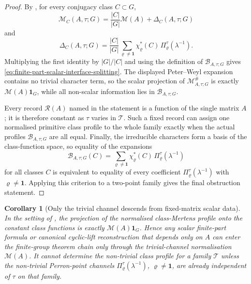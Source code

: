 \documentclass[11pt,a4paper]{amsart}
\theoremstyle{plain}
\newtheorem{corollary}[theorem]{Corollary}
\theoremstyle{definition}
\theoremstyle{remark}
\begin{document}
\begin{proof}
  By , for every conjugacy class
  \(C\subset G\),
  \[
    \mathcal M_C(A,\tau;G)
    =
    \frac{|C|}{|G|}\mathcal M(A)+\Delta_C(A,\tau;G)
  \]
  and
  \[
    \Delta_C(A,\tau;G)
    =
    \frac{|C|}{|G|}
      \sum_{\varrho\neq\mathbf1}
        \chi_\varrho^\ast(C)\,\Pi_\varrho^\tau(\lambda^{-1}).
  \]
  Multiplying the first identity by \(|G|/|C|\) and using the definition
  of \(\mathcal B_{A,\tau;G}\) gives
  \eqref{eq:finite-part-scalar-interface-splitting}. The displayed
  Peter--Weyl expansion contains no trivial character term, so the scalar
  projection of \(\mathcal M^\#_{A,\tau;G}\) is exactly
  \(\mathcal M(A)\mathbf1_G\), while all non-scalar information lies in
  \(\mathcal B_{A,\tau;G}\).

  Every record \(\mathcal R(A)\) named in the statement is a function of
  the single matrix \(A\); it is therefore constant as \(\tau\) varies in
  \(\mathscr T\). Such a fixed record can assign one normalised primitive
  class profile to the whole family exactly when the actual profiles
  \(\mathcal B_{A,\tau;G}\) are all equal. Finally, the irreducible
  characters form a basis of the class-function space, so equality of the
  expansions
  \[
    \mathcal B_{A,\tau;G}(C)
    =
    \sum_{\varrho\neq\mathbf1}
      \chi_\varrho^\ast(C)\,\Pi_\varrho^\tau(\lambda^{-1})
  \]
  for all classes \(C\) is equivalent to equality of every coefficient
  \(\Pi_\varrho^\tau(\lambda^{-1})\) with
  \(\varrho\neq\mathbf1\). Applying this criterion to a two-point family
  gives the final obstruction statement.
\end{proof}


\begin{corollary}[Only the trivial channel descends from fixed-matrix
  scalar data]
  \label{cor:fixed-matrix-scalar-interface-only}
  In the setting of ,
  the projection of the normalised class-Mertens profile onto the constant
  class functions is exactly \(\mathcal M(A)\mathbf1_G\).  Hence any
  scalar finite-part formula or canonical cyclic-lift reconstruction that
  depends only on \(A\) can enter the finite-group theorem chain only
  through the trivial-channel normalisation \(\mathcal M(A)\).  It cannot
  determine the non-trivial class profile for a family \(\mathscr T\)
  unless the non-trivial Perron-point channels
  \(\Pi_\varrho^\tau(\lambda^{-1})\), \(\varrho\neq\mathbf1\), are
  already independent of \(\tau\) on that family.
\end{corollary}
\end{document}

